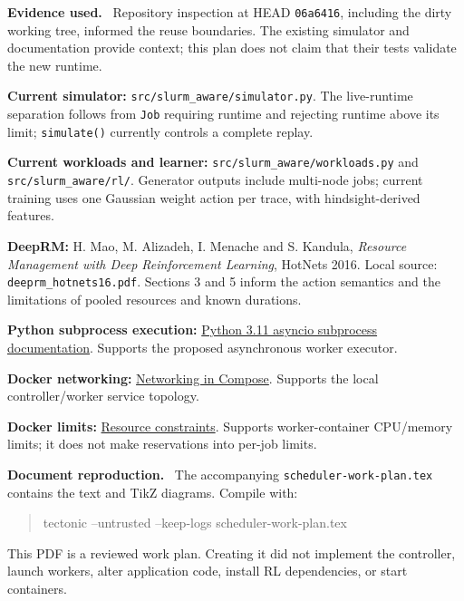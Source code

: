 \documentclass[10pt,letterpaper]{article}
\newcommand{\lead}[1]{\par\vspace{3pt}\textbf{#1}\ }
\newcommand{\code}[1]{\texttt{#1}}
\begin{document}
\lead{Evidence used.} Repository inspection at HEAD \code{06a6416}, including the dirty
working tree, informed the reuse boundaries. The existing simulator and documentation
provide context; this plan does not claim that their tests validate the new runtime.

\begin{enumerate}[label={[\arabic*]},leftmargin=22pt,itemsep=7pt]
\item \textbf{Current simulator:} \code{src/slurm\_aware/simulator.py}. The live-runtime
separation follows from \code{Job} requiring runtime and rejecting runtime above its limit;
\code{simulate()} currently controls a complete replay.
\item \textbf{Current workloads and learner:} \code{src/slurm\_aware/workloads.py} and
\code{src/slurm\_aware/rl/}. Generator outputs include multi-node jobs; current training
uses one Gaussian weight action per trace, with hindsight-derived features.
\item \textbf{DeepRM:} H. Mao, M. Alizadeh, I. Menache and S. Kandula,
\emph{Resource Management with Deep Reinforcement Learning}, HotNets 2016.
Local source: \code{deeprm\_hotnets16.pdf}. Sections 3 and 5 inform the action semantics
and the limitations of pooled resources and known durations.
\item \textbf{Python subprocess execution:}
\href{https://docs.python.org/3.11/library/asyncio-subprocess.html}{Python 3.11 asyncio subprocess documentation}.
Supports the proposed asynchronous worker executor.
\item \textbf{Docker networking:}
\href{https://docs.docker.com/compose/how-tos/networking/}{Networking in Compose}.
Supports the local controller/worker service topology.
\item \textbf{Docker limits:}
\href{https://docs.docker.com/engine/containers/resource_constraints/}{Resource constraints}.
Supports worker-container CPU/memory limits; it does not make reservations into per-job limits.
\end{enumerate}

\lead{Document reproduction.} The accompanying \code{scheduler-work-plan.tex} contains
the text and TikZ diagrams. Compile with:
\begin{quote}\ttfamily\small
tectonic --untrusted --keep-logs scheduler-work-plan.tex
\end{quote}
This PDF is a reviewed work plan. Creating it did not implement the controller, launch
workers, alter application code, install RL dependencies, or start containers.
\end{document}
